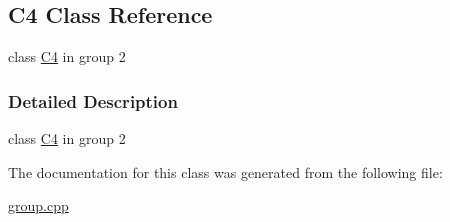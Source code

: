 \hypertarget{class_c4}{}\subsection{C4 Class Reference}
\label{class_c4}


class \mbox{\hyperlink{class_c4}{C4}} in group 2  




\subsubsection{Detailed Description}
class \mbox{\hyperlink{class_c4}{C4}} in group 2 

The documentation for this class was generated from the following file\+:\begin{DoxyCompactItemize}
\item 
\mbox{\hyperlink{group_8cpp}{group.\+cpp}}\end{DoxyCompactItemize}
